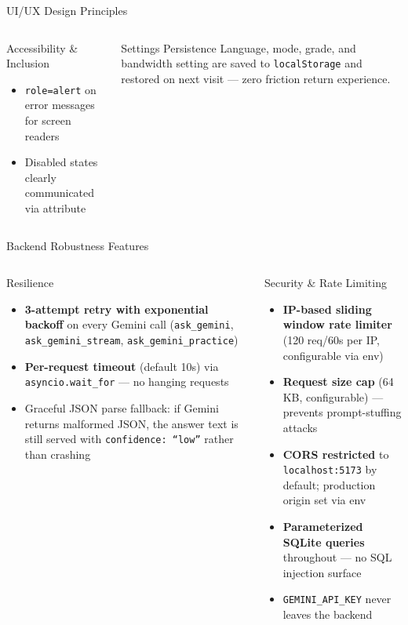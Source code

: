 \documentclass[aspectratio=169, 12pt]{beamer}
\begin{document}
\begin{frame}{UI/UX Design Principles}
\begin{columns}[T]
\begin{block}{Accessibility \& Inclusion}
\begin{itemize}
          \item \texttt{role=alert} on error messages for screen readers
          \item Disabled states clearly communicated via attribute
        \end{itemize}
      \end{block}
      \vspace{6pt}
      \begin{block}{Settings Persistence}
        \small Language, mode, grade, and bandwidth setting are
        saved to \texttt{localStorage} and restored on next visit ---
        zero friction return experience.
      \end{block}
  \end{columns}
\end{frame}

\begin{frame}{Backend Robustness Features}
  \begin{columns}[T]
      \begin{block}{Resilience}
        \begin{itemize}\small
          \item \textbf{3-attempt retry with exponential backoff}
                on every Gemini call (\texttt{ask\_gemini},
                \texttt{ask\_gemini\_stream},
                \texttt{ask\_gemini\_practice})
          \item \textbf{Per-request timeout} (default 10s)
                via \texttt{asyncio.wait\_for} --- no hanging requests
          \item Graceful JSON parse fallback: if Gemini returns
                malformed JSON, the answer text is still served
                with \texttt{confidence: ``low''} rather than crashing
        \end{itemize}
      \end{block}
      \begin{block}{Security \& Rate Limiting}
        \begin{itemize}\small
          \item \textbf{IP-based sliding window rate limiter}\\
                (120 req/60s per IP, configurable via env)
          \item \textbf{Request size cap} (64 KB, configurable)
                --- prevents prompt-stuffing attacks
          \item \textbf{CORS restricted} to \texttt{localhost:5173}
                by default; production origin set via env
          \item \textbf{Parameterized SQLite queries} throughout
                --- no SQL injection surface
          \item \texttt{GEMINI\_API\_KEY} never leaves the backend
        \end{itemize}
      \end{block}
  \end{columns}
\end{frame}
\end{document}
